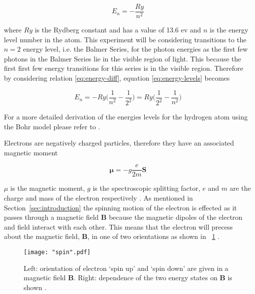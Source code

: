 \documentclass{article}
\newcommand{\figref}[2][\figurename~]{#1\ref{#2}}
\newcommand{\secref}[2][Section~]{#1\ref{#2}}
\begin{document}
\begin{equation}
\label{eq:energy-levels}
E_n = -\frac{Ry}{n^2}
\end{equation}

\vspace{2mm}
\noindent
where $Ry$ is the Rydberg constant and has a value of 13.6 ev and $n$ is the energy level number in the atom. This experiment will be considering transitions to the $n = 2$ energy level, i.e. the Balmer Series, for the photon energies as the first few photons in the Balmer Series lie in the visible region of light. This because the first first few energy transitions for this series is in the visible region. Therefore by considering relation \eqref{eq:energy-diff}, equation \eqref{eq:energy-levels} becomes

\begin{equation}
\label{eq:balmer-series}
E_n = -Ry\Bigg(\frac{1}{n^2} - \frac{1}{2^2}\Bigg) = Ry\Bigg(\frac{1}{2^2} - \frac{1}{n^2}\Bigg)
\end{equation}

\vspace{2mm}
\noindent
For a more detailed derivation of the energies levels for the hydrogen atom using the Bohr model please refer to \cite{Book02}.

\vspace{2mm}
\noindent
Electrons are negatively charged particles, therefore they have an associated magnetic moment

\begin{equation}
\label{eq:magnetic-moment}
\boldsymbol{\mu} = -g\frac{e}{2m}\textbf{S}
\end{equation}

\vspace{2mm}
\noindent
\textbf{$\mu$} is the magnetic moment, $g$ is the spectroscopic splitting factor, $e$ and $m$ are the charge and mass of the electron respectively \cite{Paper02}. As mentioned in \secref{sec:introduction} the spinning motion of the electron is effected as it passes through a magnetic field \textbf{B} because the magnetic dipoles of the electron and field interact with each other. This means that the electron will precess about the magnetic field, \textbf{B}, in one of two orientations as shown in \figref{fig:spin} \cite{Paper02}.

\begin{figure}[h]
\centering
\texttt{[image: "spin".pdf]}
\caption{Left: orientation of electron `spin up' and `spin down' are given in a magnetic field \textbf{B}. Right: dependence of the two energy states on \textbf{B} is shown \cite{Paper02}.}
\label{fig:spin}
\end{figure}
\end{document}
